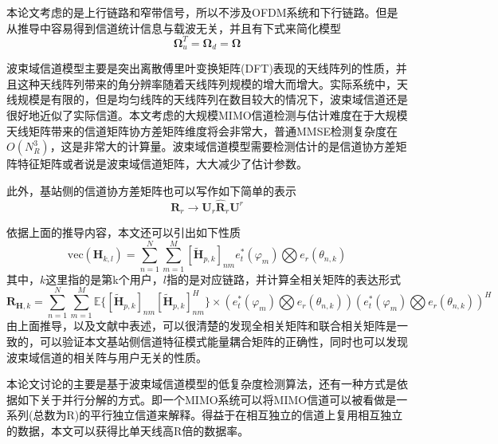 \documentclass[bachelor,nocolorlinks, printoneside]{seuthesis} %
\begin{document}
\begin{Main}
本论文考虑的是上行链路和窄带信号，所以不涉及OFDM系统和下行链路。但是从推导中容易得到信道统计信息与载波无关，并且有下式来简化模型
\begin{equation}\label{key}
\bm{\Omega}_u^T = \bm{\Omega}_d =\bm{\Omega}
\end{equation}

波束域信道模型主要是突出离散傅里叶变换矩阵(DFT)表现的天线阵列的性质，并且这种天线阵列带来的角分辨率随着天线阵列规模的增大而增大。实际系统中，天线规模是有限的，但是均匀线阵的天线阵列在数目较大的情况下，波束域信道还是很好地近似了实际信道。本文考虑的大规模MIMO信道检测与估计难度在于大规模天线矩阵带来的信道矩阵协方差矩阵维度将会非常大，普通MMSE检测复杂度在$O(N_R^3)$，这是非常大的计算量。波束域信道模型需要检测估计的是信道协方差矩阵特征矩阵或者说是波束域信道矩阵，大大减少了估计参数。

此外，基站侧的信道协方差矩阵也可以写作如下简单的表示
\begin{equation}\label{key}
\mathbf{R}_r \rightarrow \mathbf{U}_r \hat{\mathbf{R}}_r \mathbf{U}^{r}
\end{equation}

依据上面的推导内容，本文还可以引出如下性质
\begin{equation}\label{key}
\mathrm{vec}(\mathbf{H}_{k,l}) = \sum_{n=1}^{N} \sum_{m=1}^{M} [\tilde{\mathbf{H}}_{p,k}]_{nm} e^{*}_{t}(\varphi_{m} )\bigotimes e_{r}(\theta_{n,k})
\end{equation}
其中，$k$这里指的是第k个用户，$l$指的是对应链路，并计算全相关矩阵的表达形式
\begin{equation}\label{key}
\mathbf{R}_{\mathbf{H},k} = \sum_{n=1}^{N} \sum_{m=1}^{M} \mathbb{E} \lbrace [\tilde{\mathbf{H}}_{p,k}]_{nm} [\tilde{\mathbf{H}}_{p,k}]_{nm}^{H}   \rbrace \times
(e^{*}_{t}(\varphi_{m} )\bigotimes e_{r}(\theta_{n,k})) (e^{*}_{t}(\varphi_{m} )\bigotimes e_{r}(\theta_{n,k}))^{H}
\end{equation}
由上面推导，以及文献中表述，可以很清楚的发现全相关矩阵和联合相关矩阵是一致的，可以验证本文基站侧信道特征模式能量耦合矩阵的正确性，同时也可以发现波束域信道的相关阵与用户无关的性质。

本论文讨论的主要是基于波束域信道模型的低复杂度检测算法，还有一种方式是依据如下关于并行分解的方式。即一个MIMO系统可以将MIMO信道可以被看做是一系列(总数为R)的平行独立信道来解释。得益于在相互独立的信道上复用相互独立的数据，本文可以获得比单天线高R倍的数据率。


\end{Main}
\end{document}
